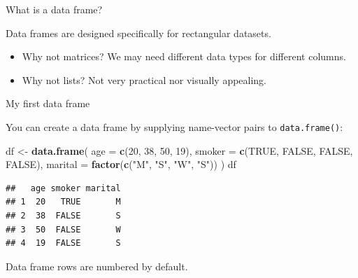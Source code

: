 \documentclass[ignorenonframetext,]{beamer}
\newenvironment{Shaded}{\begin{snugshade}}{\end{snugshade}}
\newcommand{\DataTypeTok}[1]{\textcolor[rgb]{0.13,0.29,0.53}{#1}}
\newcommand{\DecValTok}[1]{\textcolor[rgb]{0.00,0.00,0.81}{#1}}
\newcommand{\KeywordTok}[1]{\textcolor[rgb]{0.13,0.29,0.53}{\textbf{#1}}}
\newcommand{\NormalTok}[1]{#1}
\newcommand{\OtherTok}[1]{\textcolor[rgb]{0.56,0.35,0.01}{#1}}
\newcommand{\StringTok}[1]{\textcolor[rgb]{0.31,0.60,0.02}{#1}}
\begin{document}
\begin{frame}{What is a data frame?}
\protect\hypertarget{what-is-a-data-frame}{}

Data frames are designed specifically for rectangular datasets.

\begin{itemize}
\item
  Why not matrices? We may need different data types for different
  columns.
\item
  Why not lists? Not very practical nor visually appealing.
\end{itemize}

\end{frame}

\begin{frame}[fragile]{My first data frame}
\protect\hypertarget{my-first-data-frame}{}

You can create a data frame by supplying name-vector pairs to
\texttt{data.frame()}:

\begin{Shaded}
\begin{Highlighting}[]
\NormalTok{df <-}\StringTok{ }\KeywordTok{data.frame}\NormalTok{(}
\DataTypeTok{age =} \KeywordTok{c}\NormalTok{(}\DecValTok{20}\NormalTok{, }\DecValTok{38}\NormalTok{, }\DecValTok{50}\NormalTok{, }\DecValTok{19}\NormalTok{),}
\DataTypeTok{smoker =} \KeywordTok{c}\NormalTok{(}\OtherTok{TRUE}\NormalTok{, }\OtherTok{FALSE}\NormalTok{, }\OtherTok{FALSE}\NormalTok{, }\OtherTok{FALSE}\NormalTok{),}
\DataTypeTok{marital =} \KeywordTok{factor}\NormalTok{(}\KeywordTok{c}\NormalTok{(}\StringTok{"M"}\NormalTok{, }\StringTok{"S"}\NormalTok{, }\StringTok{"W"}\NormalTok{, }\StringTok{"S"}\NormalTok{))}
\NormalTok{)}
\NormalTok{df}
\end{Highlighting}
\end{Shaded}

\begin{verbatim}
##   age smoker marital
## 1  20   TRUE       M
## 2  38  FALSE       S
## 3  50  FALSE       W
## 4  19  FALSE       S
\end{verbatim}

Data frame rows are numbered by default.

\end{frame}
\end{document}
